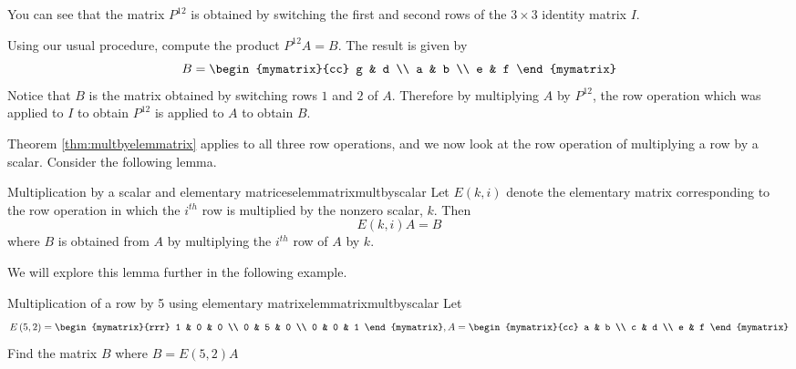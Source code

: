\begin{solution}
You can see that the matrix $P^{12}$ is obtained by switching the first and second rows of the $3 \times 3$ identity matrix $I$.

Using our usual procedure, compute the product $P^{12}A = B$. The result is given by
\begin{equation*}
B =\begin{mymatrix}{cc}
g & d \\
a & b \\
e & f
\end{mymatrix}
\end{equation*}
Notice that $B$ is the matrix obtained by switching rows $1$ and $2$ of $A$. Therefore by  multiplying 
$A$ by $P^{12}$, the row operation which was applied to $I$ to obtain $P^{12}$ is applied to $A$ to obtain $B$. 
\end{solution}

Theorem \ref{thm:multbyelemmatrix} applies to all three row operations, and we now 
look at the row operation of multiplying a row by a scalar.  Consider the following lemma.

\begin{lemma}{Multiplication by a scalar and elementary matrices}{elemmatrixmultbyscalar}
Let $E\left( k,i\right) $ denote the elementary matrix
corresponding to the row operation in which the $i^{th}$ row is multiplied
by the nonzero scalar, $k.$  Then
\begin{equation*}
E\left( k,i\right) A=B
\end{equation*}
where $B$ is obtained from $A$ by multiplying the $i^{th}$ row of $A$ by $k$.
\end{lemma}

We will explore this lemma further in the following example.

\begin{example}{Multiplication of a row by 5 using elementary matrix}{elemmatrixmultbyscalar}
Let
\begin{equation*}
E \left(5, 2\right) = \begin{mymatrix}{rrr}
1 & 0 & 0 \\
0 & 5 & 0 \\
0 & 0 & 1
\end{mymatrix}, A =  \begin{mymatrix}{cc}
a & b \\
c & d \\
e & f
\end{mymatrix}
\end{equation*}
Find the matrix $B$ where $B = E \left(5, 2\right)A$
\end{example}

